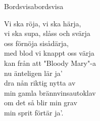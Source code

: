 \begin{song}{Bordsvisa}{bordsvisa}
\begin{vers}

Vi ska röja, vi ska härja,\\
vi ska supa, slåss och svärja\\
oss förnöja sisådärja,\\
med blod vi knappt oss värja\\
kan från att "Bloody Mary"-a\\
nu änteligen lär ja'\\
dra nån riktig nytta av  \\
min gamla brännvinsautoklav\\
om det så blir min grav\\
min sprit förtär ja'.\\
\end{vers}
\end{song}
